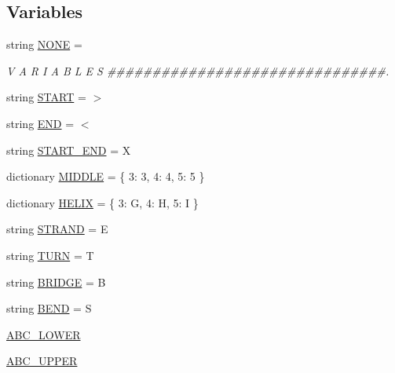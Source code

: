 \subsection*{Variables}
\begin{DoxyCompactItemize}
\item 
string \hyperlink{namespacestructures_a3126e4fe31f069875a80b0756b33a7f3}{N\+O\+NE} = \textquotesingle{} \textquotesingle{}
\begin{DoxyCompactList}\small\item\em V A R I A B L E S \#\#\#\#\#\#\#\#\#\#\#\#\#\#\#\#\#\#\#\#\#\#\#\#\#\#\#\#\#\#\#. \end{DoxyCompactList}\item 
string \hyperlink{namespacestructures_acc338e7c81af6ef2f843d67778cff88b}{S\+T\+A\+RT} = \textquotesingle{}$>$\textquotesingle{}
\item 
string \hyperlink{namespacestructures_a784c067debc6eb23318c11777b7643d3}{E\+ND} = \textquotesingle{}$<$\textquotesingle{}
\item 
string \hyperlink{namespacestructures_a046144f57557d0ea9fe2000c221fb393}{S\+T\+A\+R\+T\+\_\+\+E\+ND} = \textquotesingle{}X\textquotesingle{}
\item 
dictionary \hyperlink{namespacestructures_a0101dabe477090b7acead4bbf75ad63d}{M\+I\+D\+D\+LE} = \{ 3\+: \textquotesingle{}3\textquotesingle{}, 4\+: \textquotesingle{}4\textquotesingle{}, 5\+: \textquotesingle{}5\textquotesingle{} \}
\item 
dictionary \hyperlink{namespacestructures_a5e4b63e1c76522d73021114c8bf0ab98}{H\+E\+L\+IX} = \{ 3\+: \textquotesingle{}G\textquotesingle{}, 4\+: \textquotesingle{}H\textquotesingle{}, 5\+: \textquotesingle{}I\textquotesingle{} \}
\item 
string \hyperlink{namespacestructures_a35b53095f4d7a3bc589a0af71e4a5ad6}{S\+T\+R\+A\+ND} = \textquotesingle{}E\textquotesingle{}
\item 
string \hyperlink{namespacestructures_afcae58086c37b9c435dc934bef7a9d1a}{T\+U\+RN} = \textquotesingle{}T\textquotesingle{}
\item 
string \hyperlink{namespacestructures_ad49df5841966bdbd70cc0dbc3d477a9b}{B\+R\+I\+D\+GE} = \textquotesingle{}B\textquotesingle{}
\item 
string \hyperlink{namespacestructures_a923fa27377e5faf86a855f551b60a06b}{B\+E\+ND} = \textquotesingle{}S\textquotesingle{}
\item 
\hyperlink{namespacestructures_a2fb8c4a860481d31cb40cb025dd32509}{A\+B\+C\+\_\+\+L\+O\+W\+ER}
\item 
\hyperlink{namespacestructures_a7e2219fe0135af5a4fd1b183d996feb5}{A\+B\+C\+\_\+\+U\+P\+P\+ER}
\end{DoxyCompactItemize}


